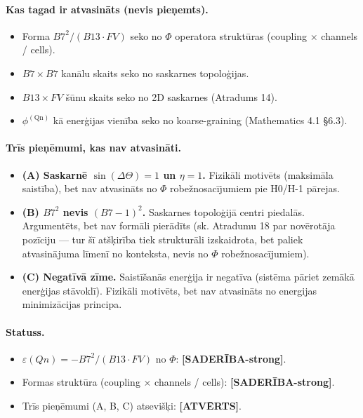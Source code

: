\documentclass[12pt,a4paper]{article}
\begin{document}
\paragraph{Kas tagad ir atvasināts (nevis pieņemts).}
\begin{itemize}
    \item Forma $B7^2/(B13 \cdot FV)$ seko no $\Phi$ operatora struktūras (coupling × channels / cells).
    \item $B7 \times B7$ kanālu skaits seko no saskarnes topoloģijas.
    \item $B13 \times FV$ šūnu skaits seko no 2D saskarnes (Atradums 14).
    \item $\phi^{(\text{Qn})}$ kā enerģijas vienība seko no koarse-graining (Mathematics 4.1 §6.3).
\end{itemize}

\paragraph{Trīs pieņēmumi, kas nav atvasināti.}
\begin{itemize}
    \item \textbf{(A) Saskarnē $\sin(\Delta\Theta)=1$ un $\eta=1$.} Fizikāli motivēts (maksimāla saistība), bet nav atvasināts no $\Phi$ robežnosacījumiem pie H0/H-1 pārejas.
    \item \textbf{(B) $B7^2$ nevis $(B7-1)^2$.} Saskarnes topoloģijā centri piedalās. Argumentēts, bet nav formāli pierādīts (sk. Atradumu 18 par novērotāja pozīciju — tur šī atšķirība tiek strukturāli izskaidrota, bet paliek atvasinājuma līmenī no konteksta, nevis no $\Phi$ robežnosacījumiem).
    \item \textbf{(C) Negatīvā zīme.} Saistīšanās enerģija ir negatīva (sistēma pāriet zemākā enerģijas stāvoklī). Fizikāli motivēts, bet nav atvasināts no energijas minimizācijas principa.
\end{itemize}

\paragraph{Statuss.}
\begin{itemize}
    \item $\varepsilon(Qn) = -B7^2/(B13 \cdot FV)$ no $\Phi$: \textbf{[SADERĪBA-strong]}.
    \item Formas struktūra (coupling × channels / cells): \textbf{[SADERĪBA-strong]}.
    \item Trīs pieņēmumi (A, B, C) atsevišķi: \textbf{[ATVĒRTS]}.
\end{itemize}
\end{document}
